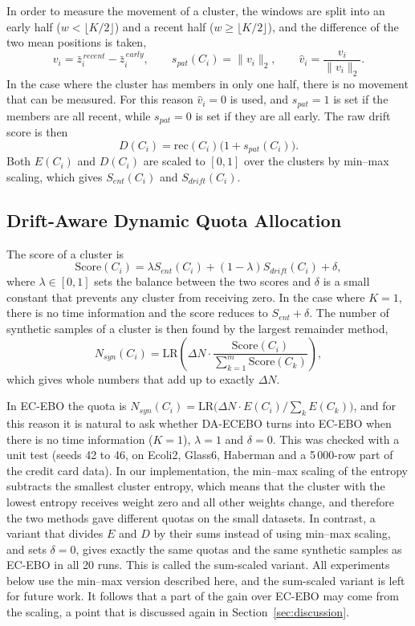\documentclass[preprint,10pt]{elsarticle}
\let\OldSubsection\subsection
\renewcommand{\subsection}{\OldSubsection}
\begin{document}
In order to measure the movement of a cluster, the windows are split into an early half ($w<\lfloor K/2\rfloor$) and a recent half ($w\ge\lfloor K/2\rfloor$), and the difference of the two mean positions is taken,
\begin{equation}
v_i=\bar z_i^{\,recent}-\bar z_i^{\,early},\qquad s_{pat}(C_i)=\|v_i\|_2,\qquad \hat v_i=\frac{v_i}{\|v_i\|_2}.
\end{equation}
In the case where the cluster has members in only one half, there is no movement that can be measured. For this reason $\hat v_i=0$ is used, and $s_{pat}=1$ is set if the members are all recent, while $s_{pat}=0$ is set if they are all early. The raw drift score is then
\begin{equation}
D(C_i)=\mathrm{rec}(C_i)\big(1+s_{pat}(C_i)\big).
\end{equation}
Both $E(C_i)$ and $D(C_i)$ are scaled to $[0,1]$ over the clusters by min--max scaling, which gives $S_{ent}(C_i)$ and $S_{drift}(C_i)$.

\subsection{Drift-Aware Dynamic Quota Allocation}\label{sec:quota}
The score of a cluster is
\begin{equation}
\mathrm{Score}(C_i)=\lambda S_{ent}(C_i)+(1-\lambda)S_{drift}(C_i)+\delta,
\end{equation}
where $\lambda\in[0,1]$ sets the balance between the two scores and $\delta$ is a small constant that prevents any cluster from receiving zero. In the case where $K=1$, there is no time information and the score reduces to $S_{ent}+\delta$. The number of synthetic samples of a cluster is then found by the largest remainder method,
\begin{equation}
N_{syn}(C_i)=\mathrm{LR}\!\left(\Delta N\cdot\frac{\mathrm{Score}(C_i)}{\sum_{k=1}^{m}\mathrm{Score}(C_k)}\right),
\end{equation}
which gives whole numbers that add up to exactly $\Delta N$.

In EC-EBO the quota is $N_{syn}(C_i)=\mathrm{LR}\big(\Delta N\cdot E(C_i)/\sum_k E(C_k)\big)$, and for this reason it is natural to ask whether DA-ECEBO turns into EC-EBO when there is no time information ($K=1$), $\lambda=1$ and $\delta=0$. This was checked with a unit test (seeds 42 to 46, on Ecoli2, Glass6, Haberman and a 5\,000-row part of the credit card data). In our implementation, the min--max scaling of the entropy subtracts the smallest cluster entropy, which means that the cluster with the lowest entropy receives weight zero and all other weights change, and therefore the two methods gave different quotas on the small datasets. In contrast, a variant that divides $E$ and $D$ by their sums instead of using min--max scaling, and sets $\delta=0$, gives exactly the same quotas and the same synthetic samples as EC-EBO in all 20 runs. This is called the sum-scaled variant. All experiments below use the min--max version described here, and the sum-scaled variant is left for future work. It follows that a part of the gain over EC-EBO may come from the scaling, a point that is discussed again in Section~\ref{sec:discussion}.
\end{document}
